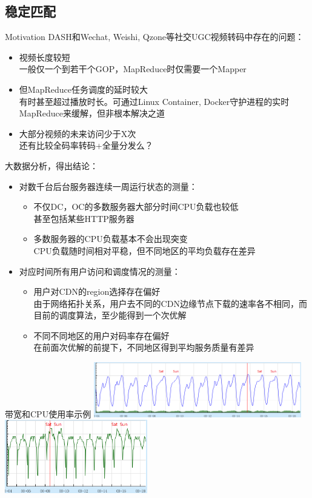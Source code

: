 \documentclass{beamer}
\begin{document}
\subsection{稳定匹配}
\begin{frame}{Motivation}
DASH和Wechat, Weishi, Qzone等社交UGC视频转码中存在的问题：
\begin{itemize}
\item 视频长度较短\\
一般仅一个到若干个GOP，MapReduce时仅需要一个Mapper
\item 但MapReduce任务调度的延时较大\\
有时甚至超过播放时长。可通过Linux Container, Docker守护进程的实时MapReduce来缓解，但非根本解决之道
\item 大部分视频的未来访问少于X次\\
还有比较全码率转码+全量分发么？
\end{itemize}
\end{frame}
\begin{frame}{大数据分析，得出结论：}
\begin{itemize}
	\item 对数千台后台服务器连续一周运行状态的测量：\\
		\begin{itemize}
		\item 不仅DC，OC的多数服务器大部分时间CPU负载也较低\\
		甚至包括某些HTTP服务器
		\item 多数服务器的CPU负载基本不会出现突变\\
		CPU负载随时间相对平稳，但不同地区的平均负载存在差异
		\end{itemize}
	\item 对应时间所有用户访问和调度情况的测量：\\
		\begin{itemize}
		\item 用户对CDN的region选择存在偏好\\
		由于网络拓扑关系，用户去不同的CDN边缘节点下载的速率各不相同，而目前的调度算法，至少能得到一个次优解
		\item 不同不同地区的用户对码率存在偏好\\
		在前面次优解的前提下，不同地区得到平均服务质量有差异
	\end{itemize}
\end{itemize}
\end{frame}
\begin{frame}{带宽和CPU使用率示例}
\includegraphics[height=2.4cm]{fig/bandwidth.png}\\
\includegraphics[height=3.2cm]{fig/cpu_usage.png}
\end{frame}
\end{document}
